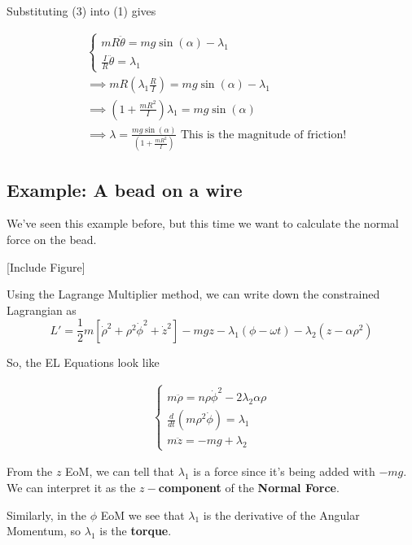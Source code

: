 \documentclass[11pt]{article}
\begin{document}
Substituting (3) into (1) gives

\begin{align*}
  &\begin{cases}
    mR \ddot{\theta} = mg \sin(\alpha) - \lambda_1 \\
    \frac{I}{R} \ddot{\theta} = \lambda_1
  \end{cases} \\ &\implies mR \left( \lambda_1 \frac{R}{I} \right) = mg\sin(\alpha) - \lambda_1 \\
  &\implies \left( 1 + \frac{mR^2}{I} \right) \lambda_1 = mg \sin(\alpha) \\
  &\implies \boxed{\lambda = \frac{mg \sin(\alpha)}{\left(1 + \frac{mR^2}{I}\right)}} \text{ This is the magnitude of friction!}
\end{align*}

\vskip 1cm
\subsection{Example: A bead on a wire}

\vskip 0.5cm
We've seen this example before, but this time we want to calculate the normal force on the bead.

\vskip 0.5cm
[Include Figure]

\vskip 0.5cm
Using the Lagrange Multiplier method, we can write down the constrained Lagrangian as 
\[ L' = \frac{1}{2}m \left[ \dot{\rho}^2 + \rho^2 \dot{\phi}^2 + \dot{z}^2 \right] -mgz - \lambda_1 \left(\phi - \omega t\right) - \lambda_2 \left(z - \alpha \rho^2\right) \]

So, the EL Equations look like 

\begin{align*}
  \begin{cases}
    m \ddot{\rho} = n\rho \dot{\phi}^2 - 2 \lambda_2 \alpha \rho \\
    \frac{d}{dt} \left( m \rho^2 \dot{\phi} \right) = \lambda_1 \\
    m \ddot{z} = -mg + \lambda_2 
  \end{cases}
\end{align*}

\vskip 0.5cm
\begin{redbox}
  From the $z$ EoM, we can tell that $\lambda_1$ is a force since it's being added with $-mg$. We can interpret it as the \textbf{$z-$component} of the \textbf{Normal Force}.

  \vskip 0.5cm
  Similarly, in the $\phi$ EoM we see that $\lambda_1$ is the derivative of the Angular Momentum, so $\lambda_1$ is the \textbf{torque}.
\end{redbox}
\end{document}
